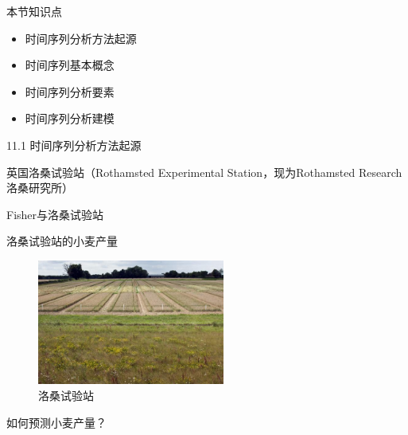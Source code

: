 \documentclass[
  ignorenonframetext,
]{beamer}
\providecommand{\tightlist}{%
  \setlength{\itemsep}{0pt}\setlength{\parskip}{0pt}}
\begin{document}
\begin{frame}{本节知识点}
\protect\hypertarget{ux672cux8282ux77e5ux8bc6ux70b9}{}

\begin{itemize}
\tightlist
\item
  时间序列分析方法起源
\item
  时间序列基本概念
\item
  时间序列分析要素
\item
  时间序列分析建模
\end{itemize}

\end{frame}

\begin{frame}{11.1 时间序列分析方法起源}
\protect\hypertarget{ux65f6ux95f4ux5e8fux5217ux5206ux6790ux65b9ux6cd5ux8d77ux6e90}{}

英国洛桑试验站（Rothamsted Experimental Station，现为Rothamsted Research
洛桑研究所）

\end{frame}

\begin{frame}{Fisher与洛桑试验站}
\protect\hypertarget{fisherux4e0eux6d1bux6851ux8bd5ux9a8cux7ad9}{}

\end{frame}

\begin{frame}{洛桑试验站的小麦产量}
\protect\hypertarget{ux6d1bux6851ux8bd5ux9a8cux7ad9ux7684ux5c0fux9ea6ux4ea7ux91cf}{}

\begin{figure}
\centering
\includegraphics[width=0.55\textwidth,height=\textheight]{figures/rothamsted.jpg}
\caption{洛桑试验站}
\end{figure}

\end{frame}

\begin{frame}{如何预测小麦产量？}
\protect\hypertarget{ux5982ux4f55ux9884ux6d4bux5c0fux9ea6ux4ea7ux91cf}{}

\end{frame}
\end{document}
